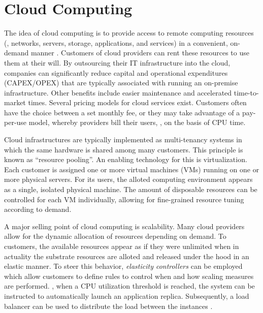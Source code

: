 


%
%
%
%
%
%
%
%
%
%

\section{Cloud Computing}

The idea of cloud computing is to provide access to remote computing resources  (\eg , networks, servers, storage, applications, and services) in a convenient, on-demand manner \cite{mell2011nist}. Customers of cloud providers can rent these resources to use them at their will. By outsourcing their IT infrastructure into the cloud, companies can significantly reduce capital and operational expenditures (CAPEX/OPEX) that are typically associated with running an on-premise infrastructure. Other benefits include easier maintenance and accelerated time-to-market times. Several pricing models for cloud services exist. Customers often have the choice between a set monthly fee, or they may take advantage of a pay-per-use model, whereby providers bill their users, \eg , on the basis of CPU time.

Cloud infrastructures are typically implemented as multi-tenancy systems in which the same hardware is shared among many customers. This principle is known as ``resource pooling''. An enabling technology for this is virtualization. Each customer is assigned one or more virtual machines (VMs) running on one or more physical servers. For its users, the alloted computing environment appears as a single, isolated physical machine. The amount of disposable resources can be controlled for each VM individually, allowing for fine-grained resource tuning according to demand.

A major selling point of cloud computing is scalability. Many cloud providers allow for the dynamic allocation of resources depending on demand. To customers, the available resources appear as if they were unlimited when in actuality the substrate resources are alloted and released under the hood in an elastic manner. To steer this behavior, \emph{elasticity controllers} can be employed which allow customers to define rules to control when and how scaling measures are performed. \Eg , when a CPU utilization threshold is reached, the system can be instructed to automatically launch an application replica. Subsequently, a load balancer can be used to distribute the load between the instances \cite{vaquero2011dynamically}.


